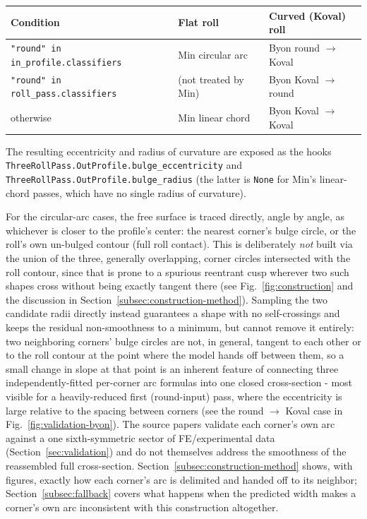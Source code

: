 \documentclass[11pt]{PyRollDocs}
\begin{document}
    \begin{center}
        \begin{tabular}{lll}
            \toprule
            Condition & Flat roll & Curved (Koval) roll \\
            \midrule
            \texttt{"round" in in\_profile.classifiers} & Min circular arc & Byon round $\to$ Koval \\
            \texttt{"round" in roll\_pass.classifiers} & (not treated by Min) & Byon Koval $\to$ round \\
            otherwise & Min linear chord & Byon Koval $\to$ Koval \\
            \bottomrule
        \end{tabular}
    \end{center}

    The resulting eccentricity and radius of curvature are exposed as the hooks
    \texttt{ThreeRollPass.OutProfile.bulge\_eccentricity} and
    \texttt{ThreeRollPass.OutProfile.bulge\_radius} (the latter is \texttt{None} for
    Min's linear-chord passes, which have no single radius of curvature).

    For the circular-arc cases, the free surface is traced directly, angle by angle,
    as whichever is closer to the profile's center: the nearest corner's bulge circle,
    or the roll's own un-bulged contour (full roll contact). This is deliberately
    \emph{not} built via the union of the three, generally overlapping, corner circles
    intersected with the roll contour, since that is prone to a spurious reentrant
    cusp wherever two such shapes cross without being exactly tangent there (see
    Fig.~\ref{fig:construction} and the discussion in
    Section~\ref{subsec:construction-method}). Sampling the two candidate radii
    directly instead guarantees a shape with no self-crossings and keeps the residual
    non-smoothness to a minimum, but cannot remove it entirely: two neighboring
    corners' bulge circles are not, in general, tangent to each other or to the roll
    contour at the point where the model hands off between them, so a small change in
    slope at that point is an inherent feature of connecting three
    independently-fitted per-corner arc formulas into one closed cross-section - most
    visible for a heavily-reduced first (round-input) pass, where the eccentricity is
    large relative to the spacing between corners (see the round $\to$ Koval case in
    Fig.~\ref{fig:validation-byon}). The source papers validate each corner's own arc
    against a one sixth-symmetric sector of FE/experimental data
    (Section~\ref{sec:validation}) and do not themselves address the smoothness of the
    reassembled full cross-section. Section~\ref{subsec:construction-method} shows,
    with figures, exactly how each corner's arc is delimited and handed off to its
    neighbor; Section~\ref{subsec:fallback} covers what happens when the predicted
    width makes a corner's own arc inconsistent with this construction altogether.
\end{document}
